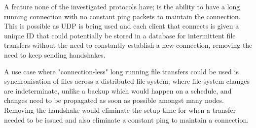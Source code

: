 A feature none of the investigated protocols have; is the ability to have a long running connection with no constant ping packets to maintain the connection. This is possible as UDP is being used and each client that connects is given a unique ID that could potentially be stored in a database for intermittent file transfers without the need to constantly establish a new connection, removing the need to keep sending handshakes.

A use case where "connection-less" long running file transfers could be used is synchronisation of files across a distributed file-system; where file system changes are indeterminate, unlike a backup which would happen on a schedule, and changes need to be propagated as soon as possible amongst many nodes. Removing the handshake would eliminate the setup time for when a transfer needed to be issued and also eliminate a constant ping to maintain a connection.
